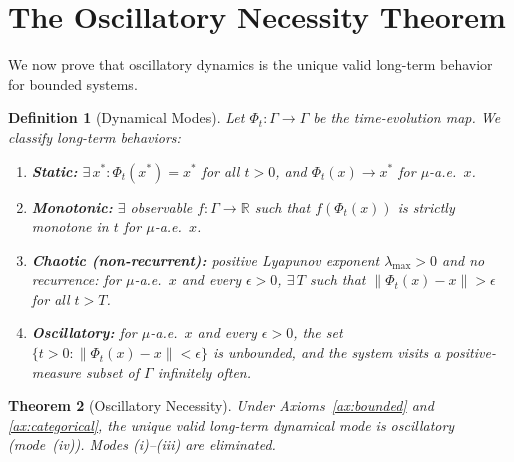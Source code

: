 \documentclass[11pt,twocolumn,a4paper]{article}
\newtheorem{theorem}{Theorem}[section]
\newtheorem{definition}[theorem]{Definition}
\newcommand{\R}{\mathbb{R}}
\begin{document}
\section{The Oscillatory Necessity Theorem}
\label{sec:oscillatory}

We now prove that oscillatory dynamics is the unique valid
long-term behavior for bounded systems.

\begin{definition}[Dynamical Modes]
\label{def:modes}
Let $\Phi_t : \Gamma \to \Gamma$ be the time-evolution map. We
classify long-term behaviors:
\begin{enumerate}[label=(\roman*),leftmargin=*]
\item \textbf{Static:} $\exists\,x^* : \Phi_t(x^*) = x^*$ for all
  $t > 0$, and $\Phi_t(x) \to x^*$ for $\mu$-a.e.\ $x$.
\item \textbf{Monotonic:} $\exists$ observable $f : \Gamma \to \R$ such
  that $f(\Phi_t(x))$ is strictly monotone in $t$ for $\mu$-a.e.\ $x$.
\item \textbf{Chaotic (non-recurrent):} positive Lyapunov exponent
  $\lambda_{\max} > 0$ and no recurrence: for $\mu$-a.e.\ $x$ and
  every $\epsilon > 0$, $\exists\,T$ such that
  $\|\Phi_t(x) - x\| > \epsilon$ for all $t > T$.
\item \textbf{Oscillatory:} for $\mu$-a.e.\ $x$ and every
  $\epsilon > 0$, the set
  $\{t > 0 : \|\Phi_t(x) - x\| < \epsilon\}$ is unbounded, and the
  system visits a positive-measure subset of $\Gamma$ infinitely often.
\end{enumerate}
\end{definition}

\begin{theorem}[Oscillatory Necessity]
\label{thm:oscillatory}
Under Axioms~\ref{ax:bounded} and \ref{ax:categorical}, the unique
valid long-term dynamical mode is oscillatory (mode~(iv)). Modes
(i)--(iii) are eliminated.
\end{theorem}
\end{document}
